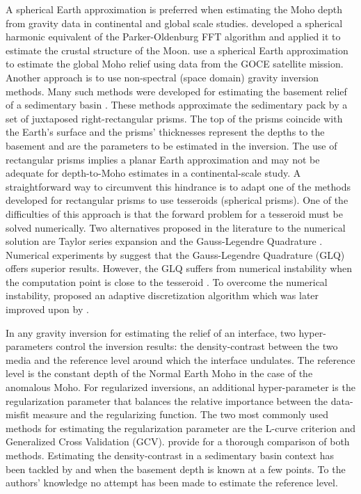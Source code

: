 \documentclass[extra,mreferee]{gji}
\begin{document}
A spherical Earth approximation is preferred when estimating the Moho depth
from gravity data in continental and global scale studies.
\citet{wieczorek1998} developed a spherical harmonic equivalent of the
Parker-Oldenburg FFT algorithm and applied it to estimate the crustal structure
of the Moon.
\citet{reguzzoni2013} use a spherical Earth approximation to estimate the
global Moho relief using data from the GOCE satellite mission.
Another approach is to use
non-spectral (space domain) gravity inversion methods.
Many such methods were developed for estimating the basement relief of a
sedimentary basin
\citep[e.g., ][]{barbosa1999a, barbosa1999b, martins2010, martins2011, sun2014}.
These methods approximate the sedimentary pack by a set of juxtaposed
right-rectangular prisms.
The top of the prisms coincide with the Earth's surface and the prisms'
thicknesses represent the depths to the basement and are the parameters to be
estimated in the inversion.
The use of rectangular prisms implies a planar Earth approximation and may not
be adequate for depth-to-Moho estimates in a continental-scale study.
A straightforward way to circumvent this hindrance is to adapt one of the
methods developed for rectangular prisms to use tesseroids (spherical prisms).
One of the difficulties of this approach is that the forward problem for a
tesseroid must be solved numerically.
Two alternatives proposed in the literature to the numerical solution are
Taylor series expansion \citep{heck2007, grombein2013}
and the Gauss-Legendre Quadrature
\citep{asgharzadeh2007}.
Numerical experiments by \citet{wild-pfeiffer2008} suggest that the
Gauss-Legendre Quadrature (GLQ) offers superior results.
However, the GLQ suffers from numerical instability when the computation point
is close to the tesseroid \citep{asgharzadeh2007}.
To overcome the numerical instability, \citet{li2011} proposed an adaptive
discretization algorithm which was later improved upon by \citet{uieda2016}.

In any gravity inversion for estimating the relief of an interface, two
hyper-parameters control the inversion results: the density-contrast between
the two media and the reference level around which the interface undulates.
The reference level is the constant depth of the Normal Earth Moho in the case
of the anomalous Moho.
For regularized inversions, an additional hyper-parameter is the regularization
parameter that balances the relative importance between the data-misfit measure
and the regularizing function.
The two most commonly used methods for estimating the regularization parameter
are the L-curve criterion and Generalized Cross Validation (GCV).
\citet{farquharson2004} provide for a thorough comparison of both methods.
Estimating the density-contrast in a sedimentary basin context has been tackled
by \citet{silva2006} and \citet{martins2010} when the basement depth is known
at a few points.
To the authors' knowledge no attempt has been made to estimate the reference
level.
\end{document}
